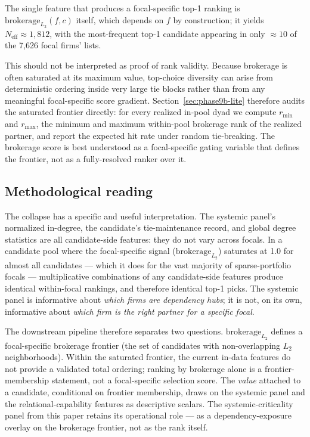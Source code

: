 \documentclass[11pt,letterpaper]{article}
\begin{document}
The single feature that produces a focal-specific top-1 ranking is
$\text{brokerage}_{L_2}(f, c)$ itself, which depends on $f$ by
construction; it yields $N_{\mathrm{eff}} \approx 1{,}812$, with the
most-frequent top-1 candidate appearing in only $\approx 10$ of the
7{,}626 focal firms' lists.

This should not be interpreted as proof of rank validity.  Because
brokerage is often saturated at its maximum value, top-choice
diversity can arise from deterministic ordering inside very large
tie blocks rather than from any meaningful focal-specific score
gradient.  Section~\ref{sec:phase9b-lite} therefore audits the
saturated frontier directly: for every realized in-pool dyad we
compute $r_{\min}$ and $r_{\max}$, the minimum and maximum
within-pool brokerage rank of the realized partner, and report the
expected hit rate under random tie-breaking.  The brokerage score
is best understood as a focal-specific gating variable that
defines the frontier, not as a fully-resolved ranker over it.

\subsection{Methodological reading}

The collapse has a specific and useful interpretation.  The systemic
panel's normalized in-degree, the candidate's tie-maintenance
record, and global degree statistics are all candidate-side
features: they do not vary across focals.  In a candidate pool where
the focal-specific signal ($\text{brokerage}_{L_2}$) saturates at 1.0
for almost all candidates --- which it does for the vast majority of
sparse-portfolio focals --- multiplicative combinations of any
candidate-side features produce identical within-focal rankings, and
therefore identical top-1 picks.  The systemic panel is informative
about \emph{which firms are dependency hubs}; it is not, on its own,
informative about \emph{which firm is the right partner for a
specific focal}.

The downstream pipeline therefore separates two questions.
$\text{brokerage}_{L_2}$ defines a focal-specific brokerage frontier
(the set of candidates with non-overlapping $L_2$ neighborhoods).
Within the saturated frontier, the current in-data features do not
provide a validated total ordering; ranking by brokerage alone is a
frontier-membership statement, not a focal-specific selection score.
The \emph{value} attached to a candidate, conditional on frontier
membership, draws on the systemic panel and the relational-capability
features as descriptive scalars.  The systemic-criticality panel from
this paper retains its operational role --- as a dependency-exposure
overlay on the brokerage frontier, not as the rank itself.
\end{document}
